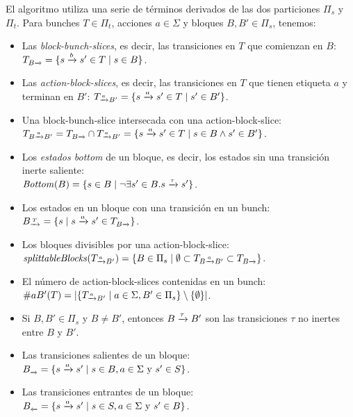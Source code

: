 El algoritmo utiliza una serie de términos derivados de las dos particiones $\Pi_s$ y $\Pi_t$.
Para bunches $T\in \Pi_t$, acciones $a \in \Sigma$ y bloques $B, B' \in \Pi_s$, tenemos:
\begin{itemize}
\item   Las \textit{block-bunch-slices}, es decir, las transiciones en $T$ que comienzan en $B$:
$
\TB = \{ s \pijl{b} s' \in T \mid s \in B \}
$.
\item   Las \textit{action-block-slices}, es decir, las transiciones en $T$ que tienen etiqueta $a$ y terminan en $B'$:
$
\TaB = \{ s \pijl{a} s' \in T \mid s' \in B' \}
$.
\item   Una block-bunch-slice intersecada con una action-block-slice:\\
\hspace*{1cm}$\TBaB = \TB \cap \TaB = \{ s \pijl{a} s' \in T \mid s \in B \wedge s' \in B' \}$.
\item   Los \textit{estados bottom} de un bloque, es decir, los estados sin una transición inerte saliente:\\
\hspace*{1cm}$
\Bottom(B) = \{ s \in B \mid \neg\exists s' \in B . s \pijl{\tau} s' \}
$.
\item   Los estados en un bloque con una transición en un bunch:
$
\BT = \{ s \mid s \pijl{a} s' \in \TB \}
$.
\item   Los bloques divisibles por una action-block-slice:\\
\hspace*{1cm}
$\splittableBlocks(\TaB) = \{ B \in \Pi_s \mid  \emptyset \subset \TBaB \subset \TB \}$.
\item   El número de action-block-slices contenidas en un bunch:\\
\hspace*{1cm}$\nraB(T) = \left| \{ \TaB \mid a \in \Sigma, B' \in
\Pi_s \} \setminus \{ \emptyset \} \right|$.
\item   Si $B, B' \in \Pi_s$ y $B \neq B'$, entonces $B \pijl{\tau} B'$ son las transiciones $\tau$ no inertes entre $B$ y $B'$.
\item   Las transiciones salientes de un bloque:
$B_{\pijl{}}=\{ s\pijl{a}s'\mid s\in B, a\in\Sigma \text{ y } s'\in S\}$.
\item   Las transiciones entrantes de un bloque:
$B_{\lijp{}}=\{ s\pijl{a}s'\mid s\in S, a\in\Sigma \text{ y } s'\in B\}$.
\end{itemize}

